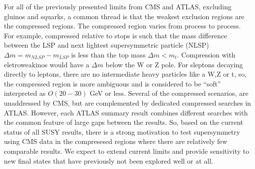For all of the previously presented limits from CMS and ATLAS, excluding gluinos and squarks, a common thread is that the weakest exclusion regions are the compressed regions. The compressed region varies from process to process. For example, compressed relative to stops is such that the mass difference between the LSP and next lightest supersymmetric particle (NLSP) $\Delta m = m_{NLSP} - m_{LSP}$ is less than the top mass $\Delta m < m_t$. Compression with eletroweakinos would have a $\Delta m$  below the W or Z pole. For sleptons decaying directly to leptons, there are no intermediate heavy particles like a W,Z or t, so, the compressed region is more ambiguous and is considered to be ``soft'' interpreted as $O(20-30)$ GeV or less. Several of the compressed scenarios, are unaddressed by CMS, but are complemented by dedicated compressed searches in ATLAS. However, each ATLAS summary result combines different searches with the common feature of large gaps between the results. So, based on the current status of all SUSY results, there is a strong motivation to test supersymmetry using CMS data in the compresesed regions where there are relatively few comparable results. We expect to extend current limits and provide sensitivity to new final states that have previously not been explored well or at all.



